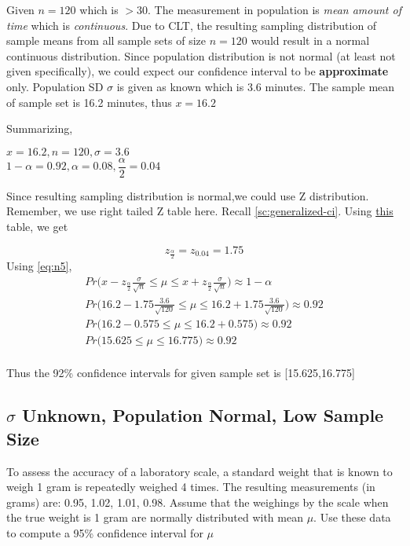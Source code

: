 \documentclass[float=false,crop=false]{standalone}
\begin{document}
Given \(n = 120\) which is \(> 30\). The measurement in population is
\emph{mean amount of time} which is \emph{continuous}. Due to CLT, the
resulting sampling distribution of sample means from all sample sets of
size \(n=120\) would result in a normal continuous distribution. Since
population distribution is not normal (at least not given specifically),
we could expect our confidence interval to be \textbf{approximate} only.
Population SD \(\sigma\) is given as known which is 3.6 minutes. The
sample mean of sample set is 16.2 minutes, thus \(x = 16.2\)

Summarizing,

\(x = 16.2, n = 120, \sigma = 3.6\)\\
\(1 - \alpha = 0.92, \alpha = 0.08, \dfrac{\alpha}{2} = 0.04\)

Since resulting sampling distribution is normal,we could use Z
distribution. Remember, we use right tailed Z table here.
Recall \ref{sc:generalized-ci}. 
    Using
\href{http://www2.stat.duke.edu/~rcs46/lectures_2015/14-bayes1/z-table.pdf}{this}
table, we get

\[
z_\frac{\alpha}{2} = z_{0.04} = 1.75
\]
Using \ref{eq:n5}, 
    \[
\begin{aligned}
            Pr\Big( x - z_{\frac{\alpha}{2}}\frac{\sigma}{\sqrt{n}} \leq \mu \leq x + z_{\frac{\alpha}{2}}\frac{\sigma}{\sqrt{n}}\Big) \approx 1-\alpha \nonumber \\
            Pr\Big( 16.2 - 1.75\frac{3.6}{\sqrt{120}} \leq \mu \leq 16.2 + 1.75\frac{3.6}{\sqrt{120}}\Big) \approx 0.92 \nonumber \\
            Pr\Big( 16.2 - 0.575 \leq \mu \leq 16.2 + 0.575\Big) \approx 0.92 \nonumber \\
            Pr\Big( 15.625 \leq \mu \leq 16.775\Big) \approx 0.92 \nonumber \\
\end{aligned}
\]

Thus the 92\% confidence intervals for given sample set is
{[}15.625,16.775{]}

    \subsection{\texorpdfstring{\(\sigma\) Unknown, Population Normal, Low
Sample
Size}{\textbackslash{}sigma Unknown, Population Normal, Low Sample Size}}\label{sigma-unknown-population-normal-low-sample-size}

    To assess the accuracy of a laboratory scale, a standard weight that is
known to weigh 1 gram is repeatedly weighed 4 times. The resulting
measurements (in grams) are: 0.95, 1.02, 1.01, 0.98. Assume that the
weighings by the scale when the true weight is 1 gram are normally
distributed with mean \(\mu\). Use these data to compute a 95\%
confidence interval for \(\mu\)
\end{document}
